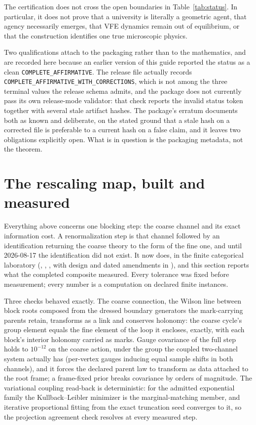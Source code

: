 \documentclass[11pt,letterpaper]{article}
\begin{document}
\begin{boundarybox}
The certification does not cross the open boundaries in Table~\ref{tab:status}. In particular, it does not prove that a university is literally a geometric agent, that agency necessarily emerges, that VFE dynamics remain out of equilibrium, or that the construction identifies one true microscopic physics.

Two qualifications attach to the packaging rather than to the mathematics, and are recorded here because an earlier version of this guide reported the status as a clean \texttt{COMPLETE\_AFFIRMATIVE}. The release file actually records \texttt{COMPLETE\_AFFIRMATIVE\_WITH\_CORRECTIONS}, which is not among the three terminal values the release schema admits, and the package does not currently pass its own release-mode validator: that check reports the invalid status token together with several stale artifact hashes. The package's erratum documents both as known and deliberate, on the stated ground that a stale hash on a corrected file is preferable to a current hash on a false claim, and it leaves two obligations explicitly open. What is in question is the packaging metadata, not the theorem.
\end{boundarybox}

\section{The rescaling map, built and measured}
\label{sec:rescaling-measured}

Everything above concerns one blocking step: the coarse channel and its exact information cost. A renormalization step is that channel followed by an identification returning the coarse theory to the form of the fine one, and until 2026-08-17 the identification did not exist. It now does, in the finite categorical laboratory (, , , with design and dated amendments in ), and this section reports what the completed composite measured. Every tolerance was fixed before measurement; every number is a computation on declared finite instances.

Three checks behaved exactly. The coarse connection, the Wilson line between block roots composed from the dressed boundary generators the mark-carrying parents retain, transforms as a link and conserves holonomy: the coarse cycle's group element equals the fine element of the loop it encloses, exactly, with each block's interior holonomy carried as marks. Gauge covariance of the full step holds to $10^{-12}$ on the coarse action, under the group the coupled two-channel system actually has (per-vertex gauges inducing equal sample shifts in both channels), and it forces the declared parent law to transform as data attached to the root frame; a frame-fixed prior breaks covariance by orders of magnitude. The variational coupling read-back is deterministic: for the admitted exponential family the Kullback--Leibler minimizer is the marginal-matching member, and iterative proportional fitting from the exact truncation seed converges to it, so the projection agreement check resolves at every measured step.
\end{document}
